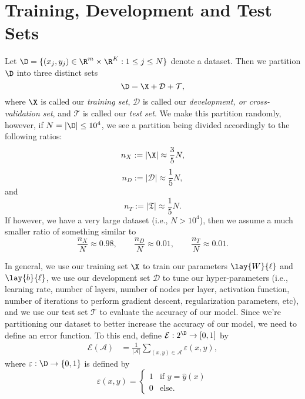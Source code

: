 

\section{Training, Development and Test Sets}

Let $\D=\{(x_j,y_j)\in\R^m\times\R^K:1\leq j\leq N\}$ denote a dataset.  Then we partition $\D$ into three distinct sets
$$\D=\X+\mathcal{D}+\mathcal{T},$$
where $\X$ is called our \textit{training set}, $\mathcal{D}$ is called our \textit{development, or cross-validation set}, and $\mathcal{T}$ is called our \textit{test set}. We make this partition randomly, however, if $N=|\D|\leq 10^4$, we see a partition being divided accordingly to the following ratios:
$$n_X:=|\X|\approx \frac{3}{5}N,$$
$$n_D:=|\mathcal{D}|\approx\frac{1}{5}N,$$
and
$$n_T:=|\mathfrak{T}|\approx\frac{1}{5}N.$$
If however, we have a very large dataset (i.e., $N>10^4$), then we assume a much smaller ratio of something similar to
$$\frac{n_X}{N}\approx0.98,\qquad\frac{n_D}{N}\approx 0.01,\qquad\frac{n_T}{N}\approx 0.01.$$

In general, we use our training set $\X$ to train our parameters $\lay{W}{\ell}$ and $\lay{b}{\ell}$, we use our development set $\mathcal{D}$ to tune our hyper-parameters (i.e., learning rate, number of layers, number of nodes per layer, activation function, number of iterations to perform gradient descent, regularization parameters, etc), and we use our test set $\mathcal{T}$ to evaluate the accuracy of our model.  Since we're partitioning our dataset to better increase the accuracy of our model, we need to define an error function.  To this end, define $\mathcal{E}:2^\D\to[0,1]$ by
\begin{align*}
	\mathcal{E}(\mathcal{A})&=\frac{1}{|\mathcal{A}|}\sum_{(x,y)\in\mathcal{A}}\varepsilon(x,y),
\end{align*}
where $\varepsilon:\D\to\{0,1\}$ is defined by
$$\varepsilon(x,y)=\begin{cases}
	1&\text{if }y = \hat{y}(x)\\
	0&\text{else.}
\end{cases}$$

